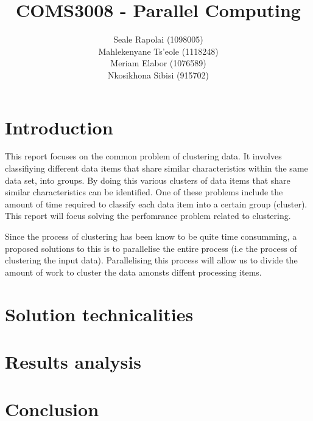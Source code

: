 \documentclass[12pt]{article}
\begin{document}
	\title{COMS3008 - Parallel Computing}
	\author{Seale Rapolai (1098005)
          \\ Mahlekenyane Ts'eole (1118248)
          \\ Meriam Elabor (1076589)
          \\ Nkosikhona Sibisi (915702)
    }
	\maketitle

	\section{Introduction}
    \begin{flushleft}
      This report focuses on the common problem of clustering data. It involves classifiying different data items that share similar characteristics within the same data set, into groups. By doing this various clusters of data items that share similar characteristics can be identified. One of these problems include the amount of time required to classify each data item into a certain group (cluster). This report will focus solving the perfomrance problem related to clustering.
    \end{flushleft}

    \begin{flushleft}
      Since the process of clustering has been know to be quite time consumming, a proposed solutions to this is to parallelise the entire process (i.e the process of clustering the input data). Parallelising this process will allow us to divide the amount of work to cluster the data amonsts diffent processing items.
    \end{flushleft}

  \section{Solution technicalities}
    \begin{flushleft}

    \end{flushleft}

  \section{Results analysis}
    \begin{flushleft}

    \end{flushleft}

  \section{Conclusion}
    \begin{flushleft}

    \end{flushleft}
\end{document}

